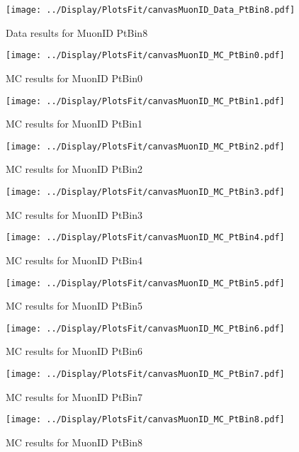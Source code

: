 \documentclass{article}
\begin{document}
\begin{figure}
    \texttt{[image: ../Display/PlotsFit/canvasMuonID\_Data\_PtBin8.pdf]}
    \caption{Data results for MuonID PtBin8 }
\end{figure}


\begin{figure}
    \texttt{[image: ../Display/PlotsFit/canvasMuonID\_MC\_PtBin0.pdf]}
    \caption{MC results for MuonID PtBin0 }
\end{figure}

\begin{figure}
    \texttt{[image: ../Display/PlotsFit/canvasMuonID\_MC\_PtBin1.pdf]}
    \caption{MC results for MuonID PtBin1 }
\end{figure}

\begin{figure}
    \texttt{[image: ../Display/PlotsFit/canvasMuonID\_MC\_PtBin2.pdf]}
    \caption{MC results for MuonID PtBin2 }
\end{figure}

\begin{figure}
    \texttt{[image: ../Display/PlotsFit/canvasMuonID\_MC\_PtBin3.pdf]}
    \caption{MC results for MuonID PtBin3 }
\end{figure}

\begin{figure}
    \texttt{[image: ../Display/PlotsFit/canvasMuonID\_MC\_PtBin4.pdf]}
    \caption{MC results for MuonID PtBin4 }
\end{figure}

\begin{figure}
    \texttt{[image: ../Display/PlotsFit/canvasMuonID\_MC\_PtBin5.pdf]}
    \caption{MC results for MuonID PtBin5 }
\end{figure}

\begin{figure}
    \texttt{[image: ../Display/PlotsFit/canvasMuonID\_MC\_PtBin6.pdf]}
    \caption{MC results for MuonID PtBin6 }
\end{figure}

\begin{figure}
    \texttt{[image: ../Display/PlotsFit/canvasMuonID\_MC\_PtBin7.pdf]}
    \caption{MC results for MuonID PtBin7 }
\end{figure}

\begin{figure}
    \texttt{[image: ../Display/PlotsFit/canvasMuonID\_MC\_PtBin8.pdf]}
    \caption{MC results for MuonID PtBin8 }
\end{figure}
\end{document}
